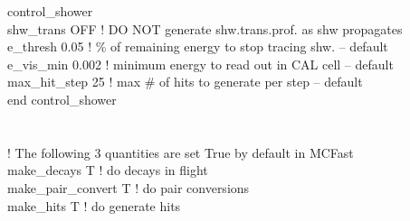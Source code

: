 control\_shower\\
  shw\_trans    OFF   ! DO NOT generate shw.trans.prof. as shw propagates \\ 
  e\_thresh     0.05  ! \% of remaining energy to stop tracing shw. -- default  \\ 
  e\_vis\_min    0.002 ! minimum energy to read out in CAL cell  -- default  \\    
  max\_hit\_step   25  ! max \# of hits to generate per step  -- default   \\       
end control\_shower \\ 
 \\ 
 \\ 
! The following 3 quantities are set True by default in MCFast \\ 
make\_decays       T    ! do decays in flight \\ 
make\_pair\_convert T    ! do pair conversions \\ 
make\_hits     T        ! do generate hits \\ 


\filbreak
